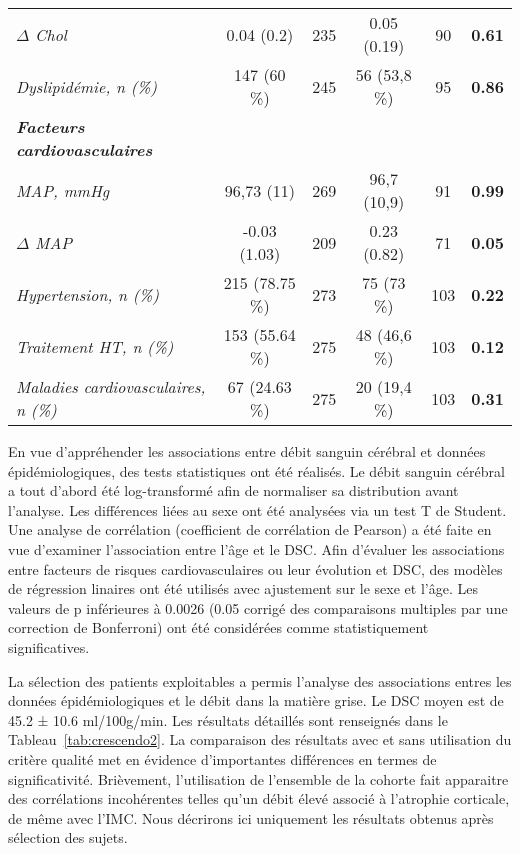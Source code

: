 \begin {table}
\begin{tabularx}{17cm}{X | c c c c c}
	{\em $\Delta$ Chol} & 0.04 (0.2) &235 &0.05 (0.19) &90 &{\bf 0.61}\\
	{\em Dyslipidémie, n (\%)} & 147 (60 \%)& 245 &56 (53,8 \%) &95 &{\bf 0.86}\\
	\hline
	{\em \bf Facteurs cardiovasculaires } &  & & & & \\
	{\em MAP, mmHg} & 96,73 (11) &269 &96,7 (10,9) &91 &{\bf 0.99}\\
	{\em $\Delta$ MAP} & -0.03 (1.03) &209 &0.23 (0.82) &71 &{\bf 0.05}\\
	{\em Hypertension, n (\%)} &215 (78.75 \%) &273 &75 (73 \%) &103 &{\bf 0.22}\\
	{\em Traitement HT, n (\%)} & 153 (55.64 \%) &275 &48 (46,6 \%) &103 &{\bf 0.12}\\
	{\em Maladies cardiovasculaires, n (\%)} & 67 (24.63 \%) &275 &20 (19,4 \%) &103 &{\bf 0.31}\\

\end{tabularx}

\end{table}

En vue d’appréhender les associations entre débit sanguin cérébral et données
épidémiologiques, des tests statistiques ont été réalisés. Le débit sanguin cérébral a tout d’abord été
log-transformé afin de normaliser sa distribution avant l’analyse. Les différences liées au sexe ont été
analysées via un test T de Student. Une analyse de corrélation (coefficient de corrélation de Pearson)
a été faite en vue d’examiner l’association entre l’âge et le DSC. Afin d’évaluer les associations entre
facteurs de risques cardiovasculaires ou leur évolution et DSC, des modèles de régression linaires ont
été utilisés avec ajustement sur le sexe et l’âge. Les valeurs de p inférieures à 0.0026 (0.05 corrigé des
comparaisons multiples par une correction de Bonferroni) ont été considérées comme statistiquement
significatives.

La sélection des patients exploitables a permis l’analyse des associations entres les données
épidémiologiques et le débit dans la matière grise. Le DSC moyen est de 45.2 ± 10.6 ml/100g/min. Les
résultats détaillés sont renseignés dans le Tableau~\ref{tab:crescendo2}. La comparaison des résultats avec et sans
utilisation du critère qualité met en évidence d’importantes différences en termes de significativité.
Brièvement, l’utilisation de l’ensemble de la cohorte fait apparaitre des corrélations incohérentes
telles qu’un débit élevé associé à l’atrophie corticale, de même avec l’IMC. Nous décrirons ici
uniquement les résultats obtenus après sélection des sujets.


